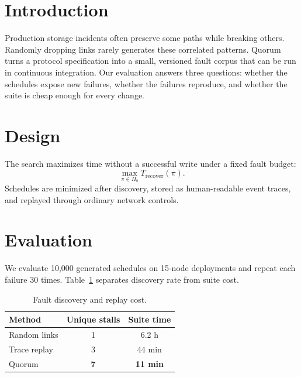 \documentclass[10pt,twocolumn]{article}
\begin{document}

\begin{abstract}
\noindent Partial network partitions make storage recovery unpredictable even
when every replica remains healthy. Quorum synthesizes adversarial connectivity
schedules from a protocol model and replays them against an unmodified cluster.
Across three systems, it finds seven recovery stalls missed by random fault
injection and reduces regression suites from hours to eleven minutes.
\end{abstract}

\section{Introduction}
Production storage incidents often preserve some paths while breaking others.
Randomly dropping links rarely generates these correlated patterns. Quorum
turns a protocol specification into a small, versioned fault corpus that can be
run in continuous integration. Our evaluation answers three questions: whether
the schedules expose new failures, whether the failures reproduce, and whether
the suite is cheap enough for every change.

\section{Design}
The search maximizes time without a successful write under a fixed fault budget:
\begin{equation}
  \max_{\pi\in\Pi_b} T_{\mathrm{recover}}(\pi).
\end{equation}
Schedules are minimized after discovery, stored as human-readable event traces,
and replayed through ordinary network controls.

\section{Evaluation}
We evaluate 10{,}000 generated schedules on 15-node deployments and repeat each
failure 30 times. Table~\ref{tab:results} separates discovery rate from suite
cost.
\begin{table}[b]
\caption{Fault discovery and replay cost.}
\label{tab:results}
\centering
\small
\begin{tabular}{lcc}
\toprule
Method & Unique stalls & Suite time \\
\midrule
Random links & 1 & 6.2 h \\
Trace replay & 3 & 44 min \\
Quorum & \textbf{7} & \textbf{11 min} \\
\bottomrule
\end{tabular}
\end{table}
\end{document}
